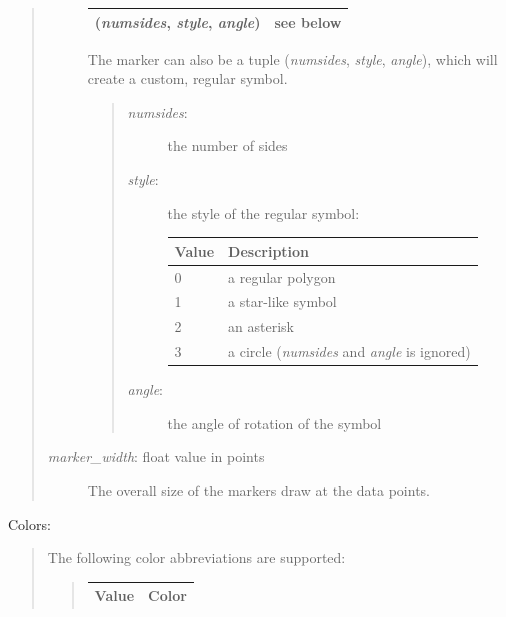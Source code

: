 \documentclass[letterpaper,10pt,english]{sphinxmanual}
\begin{document}
\begin{fulllineitems}
\begin{fulllineitems}
\begin{quote}
\begin{description}
\begin{tabulary}{\linewidth}{|L|L|}
(\emph{numsides}, \emph{style}, \emph{angle})
 & 
see below
\\\hline
\end{tabulary}


The marker can also be a tuple (\emph{numsides}, \emph{style}, \emph{angle}), 
which will create a custom, regular symbol.
\begin{quote}
\begin{description}
\item[{\emph{numsides}:}] \leavevmode
the number of sides

\item[{\emph{style}:}] \leavevmode
the style of the regular symbol:

\begin{tabulary}{\linewidth}{|L|L|}
\hline
\textbf{
Value
} & \textbf{
Description
}\\\hline

0
 & 
a regular polygon
\\\hline

1
 & 
a star-like symbol
\\\hline

2
 & 
an asterisk
\\\hline

3
 & 
a circle (\emph{numsides} and \emph{angle} is ignored)
\\\hline
\end{tabulary}


\item[{\emph{angle}:}] \leavevmode
the angle of rotation of the symbol

\end{description}
\end{quote}

\item[{\emph{marker\_width}: float value in points}] \leavevmode
The overall size of the markers draw at the data points.

\end{description}
\end{quote}

Colors:
\begin{quote}

The following color abbreviations are supported:
\begin{quote}

\begin{tabulary}{\linewidth}{|L|L|}
\hline
\textbf{
Value
} & \textbf{
Color
}\\\hline


\end{tabulary}
\end{quote}
\end{quote}
\end{fulllineitems}
\end{fulllineitems}
\end{document}
